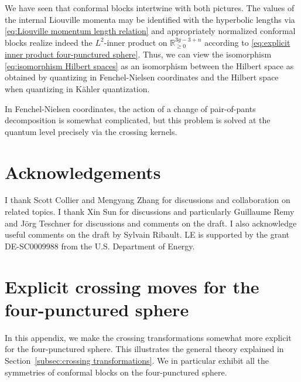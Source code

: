 \documentclass[12pt,a4paper]{article}
\begin{document}
We have seen that conformal blocks intertwine with both pictures. The values of the internal Liouville momenta may be identified with the hyperbolic lengths via \eqref{eq:Liouville momentum length relation} and appropriately normalized conformal blocks realize indeed the $L^2$-inner product on $\mathbb{R}_{\ge 0}^{3g-3+n}$ according to \eqref{eq:explicit inner product four-punctured sphere}. Thus, we can view the isomorphism \eqref{eq:isomorphism Hilbert spaces} as an isomorphism between the Hilbert space as obtained by quantizing in Fenchel-Nielsen coordinates and the Hilbert space when quantizing in K\"ahler quantization.

In Fenchel-Nielsen coordinates, the action of a change of pair-of-pants decomposition is somewhat complicated, but this problem is solved at the quantum level precisely via the crossing kernels.






\section*{Acknowledgements}
I thank Scott Collier and Mengyang Zhang for discussions and collaboration on related topics. I thank Xin Sun for discussions and particularly Guillaume Remy and J\"org Teschner for discussions and comments on the draft. I also acknowledge useful comments on the draft by Sylvain Ribault.
LE is supported by the grant DE-SC0009988 from the U.S. Department of Energy.

\appendix 

\section{Explicit crossing moves for the four-punctured sphere} \label{app:four-punctured sphere}
In this appendix, we make the crossing transformations somewhat more explicit for the four-punctured sphere. This illustrates the general theory explained in Section~\ref{subsec:crossing transformations}.
We in particular exhibit all the symmetries of conformal blocks on the four-punctured sphere.
\end{document}
